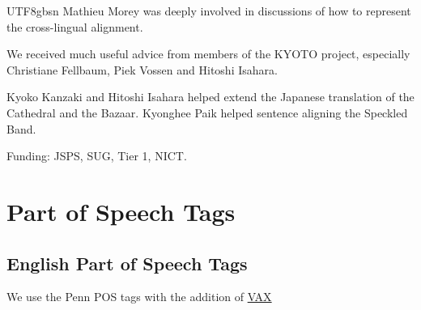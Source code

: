 \documentclass[12pt]{book} %
\newcommand{\tg}[1]{\url{#1}}  %
\begin{document}
\begin{CJK}{UTF8}{gbsn}
Mathieu Morey was deeply involved in discussions of how to represent
the cross-lingual alignment.

We received much useful advice from members of the KYOTO project,
especially Christiane Fellbaum, Piek Vossen and Hitoshi Isahara. 

Kyoko Kanzaki and Hitoshi Isahara helped extend the Japanese
translation of the Cathedral and the Bazaar.  Kyonghee Paik helped
sentence aligning the Speckled Band.

Funding: JSPS, SUG, Tier 1, NICT.





\appendix
\chapter{Part of Speech Tags}
\section{English Part of Speech Tags}

We use the Penn POS tags with the addition of \tg{VAX}


\end{CJK}
\end{document}
